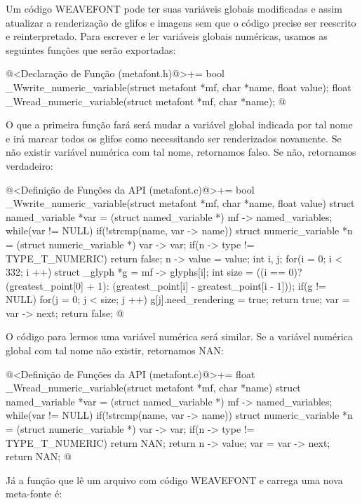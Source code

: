 {{{{{{

Um código WEAVEFONT pode ter suas variáveis globais modificadas e
assim atualizar a renderização de glifos e imagens sem que o código
precise ser reescrito e reinterpretado. Para escrever e ler variáveis
globais numéricas, usamos as seguintes funções que serão exportadas:

\iniciocodigo
@<Declaração de Função (metafont.h)@>+=
bool _Wwrite_numeric_variable(struct metafont *mf, char *name, float value);
float _Wread_numeric_variable(struct metafont *mf, char *name);
@
\fimcodigo

O que a primeira função fará será mudar a variável global indicada por
tal nome e irá marcar todos os glifos como necessitando ser
renderizados novamente. Se não existir variável numérica com tal nome,
retornamos falso. Se não, retornamos verdadeiro:

\iniciocodigo
@<Definição de Funções da API (metafont.c)@>+=
bool _Wwrite_numeric_variable(struct metafont *mf, char *name, float value){
  struct named_variable *var = (struct named_variable *) mf -> named_variables;
  while(var != NULL){
    if(!strcmp(name, var -> name)){
      struct numeric_variable *n = (struct numeric_variable *) var -> var;
      if(n -> type != TYPE_T_NUMERIC)
        return false;
      n -> value = value;
      {
        int i, j;
        for(i = 0; i < 332; i ++){
          struct _glyph *g = mf -> glyphs[i];
          int size = ((i == 0)?(greatest_point[0] + 1):
                               (greatest_point[i] - greatest_point[i - 1]));
          if(g != NULL){
            for(j = 0; j < size; j ++)
                g[j].need_rendering = true;
          }
        }
      }
      return true;
    }
    var = var -> next;
  }
  return false;
}
@
\fimcodigo

O código para lermos uma variável numérica será similar. Se a variável
numérica global com tal nome não existir, retornamos NAN:

\iniciocodigo
@<Definição de Funções da API (metafont.c)@>+=
float _Wread_numeric_variable(struct metafont *mf, char *name){
  struct named_variable *var = (struct named_variable *) mf -> named_variables;
  while(var != NULL){
    if(!strcmp(name, var -> name)){
      struct numeric_variable *n = (struct numeric_variable *) var -> var;
      if(n -> type != TYPE_T_NUMERIC)
        return NAN;
      return n -> value;
    }
    var = var -> next;
  }
  return NAN;
}
@
\fimcodigo


Já a função que lê um arquivo com código WEAVEFONT e carrega uma nova
meta-fonte é:

}}}}}}
